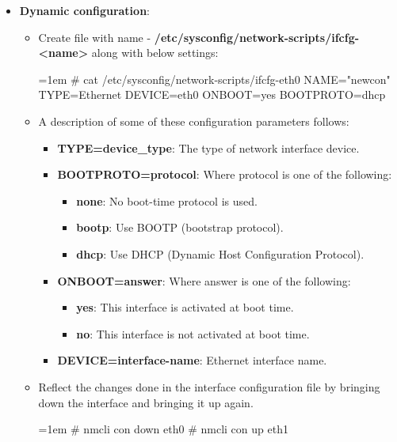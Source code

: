 \begin{flushleft}
\begin{itemize}
	\item \textbf{Dynamic configuration}: 
	\begin{itemize}
		\item Create file with name -  \textbf{/etc/sysconfig/network-scripts/ifcfg-<name>} along with below settings:
		\begin{tcolorbox}[breakable,notitle,boxrule=-0pt,colback=black,colframe=black]
			\color{green}
			\font=1em
			\# cat /etc/sysconfig/network-scripts/ifcfg-eth0
			\color{white}
			\newline
			NAME="newcon"
			\newline
			TYPE=Ethernet
			\newline
			DEVICE=eth0
			\newline
			ONBOOT=yes
			\newline
			BOOTPROTO=dhcp
			\font=4pt
		\end{tcolorbox}
		\bigskip
		\bigskip
		\item A description of some of these configuration parameters follows:
		\begin{itemize}
		\item \textbf{TYPE=device\_type}: The type of network interface device.
		\item \textbf{BOOTPROTO=protocol}: Where protocol is one of the following:
		\begin{itemize}
			\item \textbf{none}: No boot-time protocol is used.
			\item \textbf{bootp}: Use BOOTP (bootstrap protocol).
			\item \textbf{dhcp}: Use DHCP (Dynamic Host Configuration Protocol).
		\end{itemize}
		\item \textbf{ONBOOT=answer}: Where answer is one of the following:
		\begin{itemize}
			\item \textbf{yes}: This interface is activated at boot time.
			\item \textbf{no}: This interface is not activated at boot time.
		\end{itemize}
		\item \textbf{DEVICE=interface-name}: Ethernet interface name.
	\end{itemize}
	\bigskip
	\bigskip
	\item Reflect the changes done in the interface configuration file by bringing down the interface and bringing it up again.
	\bigskip
	\begin{tcolorbox}[breakable,notitle,boxrule=-0pt,colback=black,colframe=black]
		\color{green}
		\font=1em
		\# nmcli con down eth0
		\newline
		\# nmcli con up eth1
		\font=4pt
	\end{tcolorbox}		
	\end{itemize}
	

\end{itemize}
\end{flushleft}
